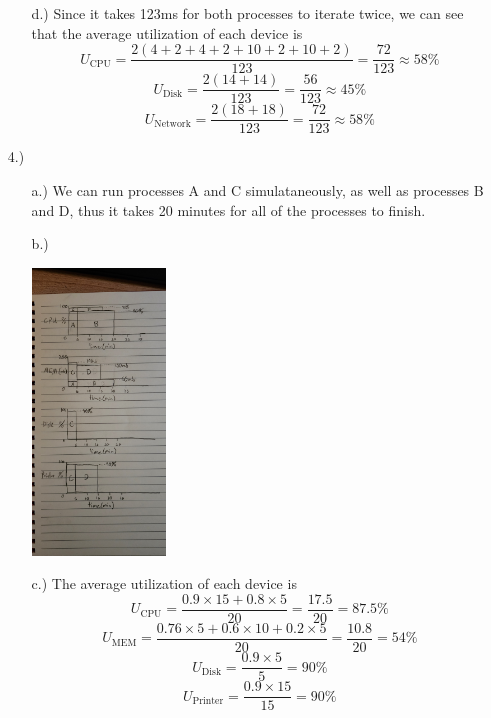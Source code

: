 \documentclass[12pt]{article}
\begin{document}
\begin{itemize}
\begin{itemize}
\begin{center}
            \end{center}

            \pagebreak
            \item [d.)] Since it takes 123ms for both processes to iterate twice,
            we can see that the average utilization of each device is
            \[
                U_{\text{CPU}}
                = \frac{2(4 + 2 + 4 + 2 + 10 + 2 + 10 + 2)}{123}
                = \frac{72}{123}
                \approx 58\%
            \]
            \[
                U_{\text{Disk}}
                = \frac{2(14 + 14)}{123}
                = \frac{56}{123}
                \approx 45\%
            \]
            \[
                U_{\text{Network}}
                = \frac{2(18 + 18)}{123}
                = \frac{72}{123}
                \approx 58\%
            \]
        \end{itemize}

        \item [4.)] \begin{itemize}
            \item [a.)] We can run processes A and C simulataneously, as well
            as processes B and D, thus it takes 20 minutes for all of the
            processes to finish.

            \item [b.)] \
            \begin{center}
                \includegraphics[height=3in, angle=-90]{4-2.jpg}
            \end{center}

            \item [c.)] The average utilization of each device is
            \[
                U_{\text{CPU}}
                = \frac{0.9 \times 15 + 0.8 \times 5}{20}
                = \frac{17.5}{20}
                = 87.5\%
            \]
            \[
                U_{\text{MEM}}
                = \frac{0.76 \times 5 + 0.6 \times 10 + 0.2 \times 5}{20}
                = \frac{10.8}{20}
                = 54\%
            \]
            \[
                U_{\text{Disk}}
                = \frac{0.9 \times 5}{5}
                = 90\%
            \]
            \[
                U_{\text{Printer}}
                = \frac{0.9 \times 15}{15}
                = 90\%
            \]


\end{itemize}
\end{itemize}
\end{document}

